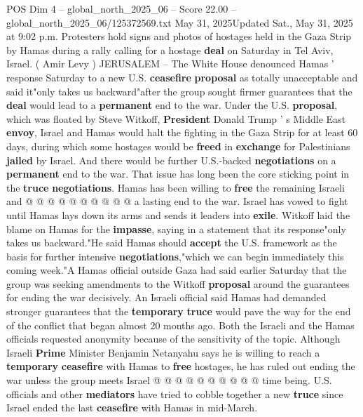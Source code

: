 \begin{textsample}{POS Dim 4 – global\_north\_2025\_06 – Score 22.00 – global\_north\_2025\_06/125372569.txt}  \label{ex:f4_pos_394}
May 31, 2025Updated Sat., May 31, 2025 at 9:02 p.m.
Protesters hold signs and photos of hostages held in the Gaza Strip by Hamas during a rally calling for a hostage \textbf{deal} on Saturday in Tel Aviv, Israel. ( Amir Levy ) JERUSALEM -- The White House denounced Hamas ' response Saturday to a new U.S. \textbf{ceasefire} \textbf{proposal} as totally unacceptable and said it"only takes us backward"after the group sought firmer guarantees that the \textbf{deal} would lead to a \textbf{permanent} end to the war.
Under the U.S. \textbf{proposal}, which was floated by Steve Witkoff, \textbf{President} Donald Trump ' s Middle East \textbf{envoy}, Israel and Hamas would halt the fighting in the Gaza Strip for at least 60 days, during which some hostages would be \textbf{freed} in \textbf{exchange} for Palestinians \textbf{jailed} by Israel.
And there would be further U.S.-backed \textbf{negotiations} on a \textbf{permanent} end to the war.
That issue has long been the core sticking point in the \textbf{truce} \textbf{negotiations}.
Hamas has been willing to \textbf{free} the remaining Israeli and @ @ @ @ @ @ @ @ @ @ a lasting end to the war.
Israel has vowed to fight until Hamas lays down its arms and sends it leaders into \textbf{exile}.
Witkoff laid the blame on Hamas for the \textbf{impasse}, saying in a statement that its response"only takes us backward."He said Hamas should \textbf{accept} the U.S. framework as the basis for further intensive \textbf{negotiations},"which we can begin immediately this coming week."A Hamas official outside Gaza had said earlier Saturday that the group was seeking amendments to the Witkoff \textbf{proposal} around the guarantees for ending the war decisively.
An Israeli official said Hamas had demanded stronger guarantees that the \textbf{temporary} \textbf{truce} would pave the way for the end of the conflict that began almost 20 months ago.
Both the Israeli and the Hamas officials requested anonymity because of the sensitivity of the topic.
Although Israeli \textbf{Prime} Minister Benjamin Netanyahu says he is willing to reach a \textbf{temporary} \textbf{ceasefire} with Hamas to \textbf{free} hostages, he has ruled out ending the war unless the group meets Israel @ @ @ @ @ @ @ @ @ @ time being.
U.S. officials and other \textbf{mediators} have tried to cobble together a new \textbf{truce} since Israel ended the last \textbf{ceasefire} with Hamas in mid-March.

\end{textsample}
